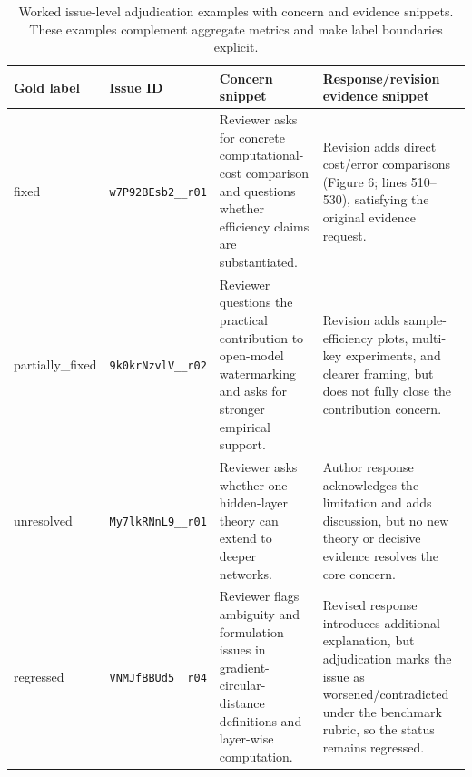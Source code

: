 \begin{table}[t]
\centering
\scriptsize
\setlength{\tabcolsep}{3pt}
\begin{tabular}{p{}p{}p{}p{}}
\toprule
Gold label & Issue ID & Concern snippet & Response/revision evidence snippet \\
\midrule
fixed & \texttt{w7P92BEsb2\_\_r01} & Reviewer asks for concrete computational-cost comparison and questions whether efficiency claims are substantiated. & Revision adds direct cost/error comparisons (Figure 6; lines 510--530), satisfying the original evidence request. \\
partially\_fixed & \texttt{9k0krNzvlV\_\_r02} & Reviewer questions the practical contribution to open-model watermarking and asks for stronger empirical support. & Revision adds sample-efficiency plots, multi-key experiments, and clearer framing, but does not fully close the contribution concern. \\
unresolved & \texttt{My7lkRNnL9\_\_r01} & Reviewer asks whether one-hidden-layer theory can extend to deeper networks. & Author response acknowledges the limitation and adds discussion, but no new theory or decisive evidence resolves the core concern. \\
regressed & \texttt{VNMJfBBUd5\_\_r04} & Reviewer flags ambiguity and formulation issues in gradient-circular-distance definitions and layer-wise computation. & Revised response introduces additional explanation, but adjudication marks the issue as worsened/contradicted under the benchmark rubric, so the status remains regressed. \\
\bottomrule
\end{tabular}
\caption{Worked issue-level adjudication examples with concern and evidence snippets. These examples complement aggregate metrics and make label boundaries explicit.}
\label{tab:worked-issue-examples}
\end{table}
